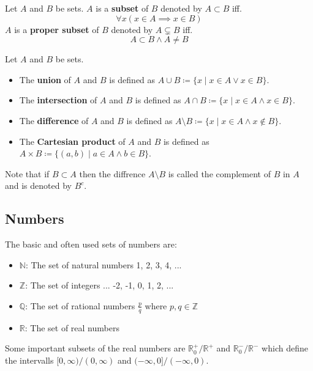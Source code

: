 \begin{definition}
    Let $A$ and $B$ be sets. $A$ is a \textbf{subset} of $B$ denoted by $A \subset B$ iff. 
    $$\forall x (x \in A \implies x \in B)$$
    $A$ is a \textbf{proper subset} of $B$ denoted by $A \subsetneq B$ iff. 
    $$A \subset B \land A \neq B$$
\end{definition}

\begin{definition}
    Let $A$ and $B$ be sets.
    \begin{itemize}
    \item The \textbf{union} of $A$ and $B$ is defined as $A \cup B \coloneqq \{x \mid x \in A \lor x \in B\}$.
    \item The \textbf{intersection} of $A$ and $B$ is defined as $A \cap B \coloneqq \{x \mid x \in A \land x \in B\}$.
    \item The \textbf{difference} of $A$ and $B$ is defined as $A \setminus B \coloneqq \{x \mid x \in A \land x \notin B\}$.
    \item The \textbf{Cartesian product} of $A$ and $B$ is defined as $A \times B \coloneqq \{(a, b) \mid a \in A \land b \in B\}$.
\end{itemize}
\end{definition}

\begin{remark}
    Note that if $B \subset A$ then the diffrence $A \setminus B$ is called the complement of $B$ in $A$ and is denoted by $B^c$.
\end{remark}

\subsection{Numbers}

The basic and often used sets of numbers are:

\begin{itemize}
    \item $\mathbb{N}$: The set of natural numbers 1, 2, 3, 4, ...
    \item $\mathbb{Z}$: The set of integers ... -2, -1, 0, 1, 2, ...
    \item $\mathbb{Q}$: The set of rational numbers $\frac{p}{q}$ where $p, q \in \mathbb{Z}$
    \item $\mathbb{R}$: The set of real numbers
\end{itemize}

\begin{remark}
    Some important subsets of the real numbers are $\mathbb{R}^{+}_{0} / \mathbb{R}^{+}$ and $\mathbb{R}^{-}_{0} / \mathbb{R}^{-}$ which define the intervalls $[0, \infty) / (0, \infty)$ and $(-\infty, 0] / (-\infty, 0)$.
\end{remark}

